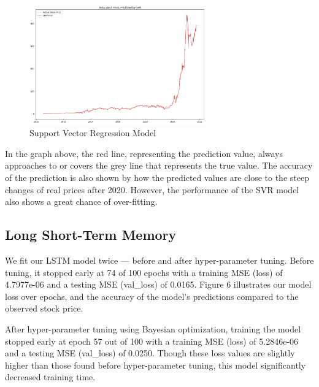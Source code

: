 \documentclass[12pt,a4paper]{article}
\begin{document}
\begin{figure}[h]
\caption{Support Vector Regression Model}
\centering
\includegraphics[width=3in]{./Figures/SVM.png}
\end{figure}

In the graph above, the red line, representing the prediction value, always approaches to or covers the grey line that represents the true value. The accuracy of the prediction is also shown by how the predicted values are close to the steep changes of real prices after 2020. However, the performance of the SVR model also shows a great chance of over-fitting.

\subsection{Long Short-Term Memory}
We fit our LSTM model twice — before and after hyper-parameter tuning. Before tuning, it stopped early at 74 of 100 epochs with a training MSE (loss) of 4.7977e-06 and a testing MSE (val\_loss) of 0.0165. Figure 6 illustrates our model loss over epochs, and the accuracy of the model’s predictions compared to the observed stock price.

After hyper-parameter tuning using Bayesian optimization, training the model stopped early at epoch 57 out of 100 with a training MSE (loss) of 5.2846e-06 and a testing MSE (val\_loss) of 0.0250. Though these loss values are slightly higher than those found before hyper-parameter tuning, this model significantly decreased training time.
\end{document}
